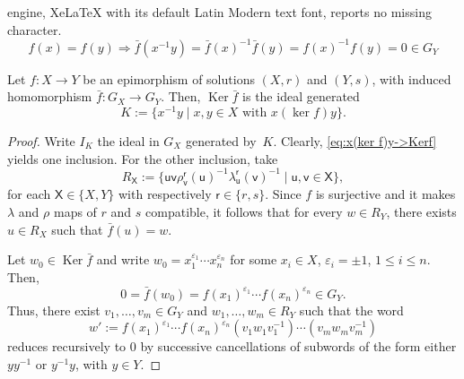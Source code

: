 \documentclass[10pt,a4paper]{amsart}
\DeclareMathOperator{\Ker}{Ker}
\begin{document}
engine, XeLaTeX with its default Latin Modern text font, reports no missing character.
\begin{equation}
\label{eq:x(ker f)y->Kerf}
f(x) = f(y) \Rightarrow \bar{f}(x^{-1}y) = \bar{f}(x)^{-1}\bar f(y) = f(x)^{-1}f(y) = 0 \in G_Y
\end{equation}

\begin{lema}
\label{lema:kerbarf}
Let $f \colon X \rightarrow Y$ be an epimorphism of solutions $(X,r)$ and $(Y,s)$, with induced homomorphism $\bar f\colon G_X \rightarrow G_Y$. Then, $\Ker \bar f$ is the ideal generated 
\[ K:= \{x^{-1}y \mid \text{$x,y \in X$ with $x (\ker f) y$}\}.\]
\end{lema}

\begin{proof}
Write $I_K$ the ideal in $G_X$ generated by~$K$. Clearly, \eqref{eq:x(ker f)y->Kerf} yields one inclusion. For the other inclusion, take 
\[ R_{\mathsf{X}} := \{ \mathsf{u}\mathsf{v}\rho_{\mathsf{v}}^{\mathsf{r}}(\mathsf{u})^{-1}\lambda_{\mathsf{u}}^{\mathsf{r}}(\mathsf v)^{-1} \mid \mathsf{u,v} \in \mathsf{X}\},\] for each $\mathsf{X}\in \{X,Y\}$ with respectively $\mathsf{r}\in \{r,s\}$. Since $f$ is surjective and it makes $\lambda$ and $\rho$ maps of $r$ and $s$ compatible, it follows that for every $w\in R_Y$, there exists $u \in R_X$ such that $\bar f(u) = w$.



Let $w_0 \in \Ker \bar f$ and write $w_0 = x_1^{\varepsilon_1}\cdots x_n^{\varepsilon_n}$ for some $x_i \in X$, $\varepsilon_i =\pm 1$, $1\leq i \leq n$. Then,
\[ 0 = \bar f(w_0) = f(x_1)^{\varepsilon_1}\cdots f(x_n)^{\varepsilon_n} \in G_Y.\]
Thus, there exist $v_1, \ldots, v_m \in G_Y$ and $w_1, \ldots, w_m \in R_Y$ such that the word
\[
w':= f(x_1)^{\varepsilon_1} \cdots f(x_n)^{\varepsilon_n} (v_1 w_1 v_1^{-1}) \cdots (v_m w_m v_m^{-1})
\]
reduces recursively to $0$
by successive cancellations of subwords of the form either $yy^{-1}$ or $y^{-1}y$, with $y \in Y$.


\end{proof}
\end{document}
